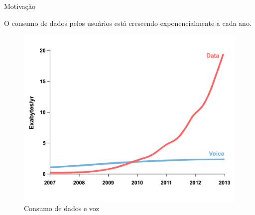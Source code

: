 \documentclass[aspectratio=169]{beamer}
\newcommand*\setcaptioncitation[1]{\def\captioncitation{\textit{Source:}~#1}}
\let\captioncitation\relax
\begin{document}
    \begin{frame} {Motivação}
            
        \centering
        \Large
             O consumo de dados pelos usuários está crescendo exponencialmente a cada ano.
            \begin{figure}[ht]    
                \includegraphics[scale=0.3]{consumo.png}
                \setcaptioncitation{The Cloud Begins With Coal , Ericsson Mobility Report, June 2013 }
                \caption{Consumo de dados e voz}
                \label{fig:consumo}
            \end{figure}

    \end{frame}
    
\end{document}
